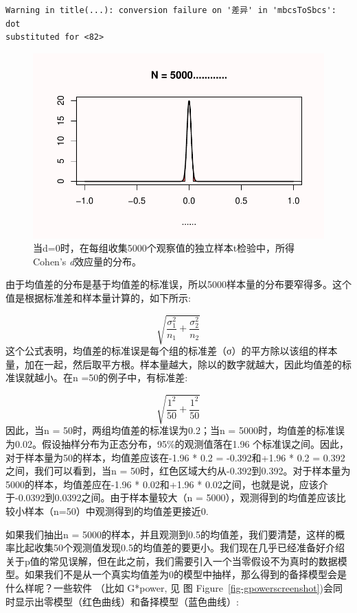 \documentclass[
  letterpaper,
  DIV=11,
  numbers=noendperiod]{scrreprt}
\begin{document}
\begin{verbatim}
Warning in title(...): conversion failure on '差异' in 'mbcsToSbcs': dot
substituted for <82>
\end{verbatim}

\begin{figure}

{\centering \includegraphics[width=1\textwidth,height=\textheight]{01-pvalue_files/figure-pdf/fig-fig132-1.pdf}

}

\caption{\label{fig-fig132}当d=0时，在每组收集5000个观察值的独立样本t检验中，所得Cohen's
\emph{d}效应量的分布。}

\end{figure}

由于均值差的分布是基于均值差的标准误，所以5000样本量的分布要窄得多。这个值是根据标准差和样本量计算的，如下所示:

\[\sqrt{\frac{\sigma_{1}^{2}}{n_{1}}+\frac{\sigma_{2}^{2}}{n_{2}}}\]
这个公式表明，均值差的标准误是每个组的标准差（σ）的平方除以该组的样本量，加在一起，然后取平方根。样本量越大，除以的数字就越大，因此均值差的标准误就越小。在n
=50的例子中，有标准差:

\[\sqrt{\frac{1^{2}}{50}+\frac{1^{2}}{50}}\] 因此，当n =
50时，两组均值差的标准误为0.2；当n =
5000时，均值差的标准误为0.02。假设抽样分布为正态分布，95\%的观测值落在1.96
个标准误之间。因此，对于样本量为50的样本，均值差应该在-1.96 * 0.2 =
-0.392和+1.96 * 0.2 = 0.392之间，我们可以看到，当n =
50时，红色区域大约从-0.392到0.392。对于样本量为5000的样本，均值差应在-1.96
* 0.02和+1.96 *
0.02之间，也就是说，应该介于-0.0392到0.0392之间。由于样本量较大（n =
5000），观测得到的均值差应该比较小样本（n=50）中观测得到的均值差更接近0.

如果我们抽出n =
5000的样本，并且观测到0.5的均值差，我们要清楚，这样的概率比起收集50个观测值发现0.5的均值差的要更小。我们现在几乎已经准备好介绍关于p值的常见误解，但在此之前，我们需要引入一个当零假设不为真时的数据模型。如果我们不是从一个真实均值差为0的模型中抽样，那么得到的备择模型会是什么样呢？一些软件
（比如 G*power, 见 图
Figure~\ref{fig-gpowerscreenshot})会同时显示出零模型（红色曲线）和备择模型（蓝色曲线）:
\end{document}
